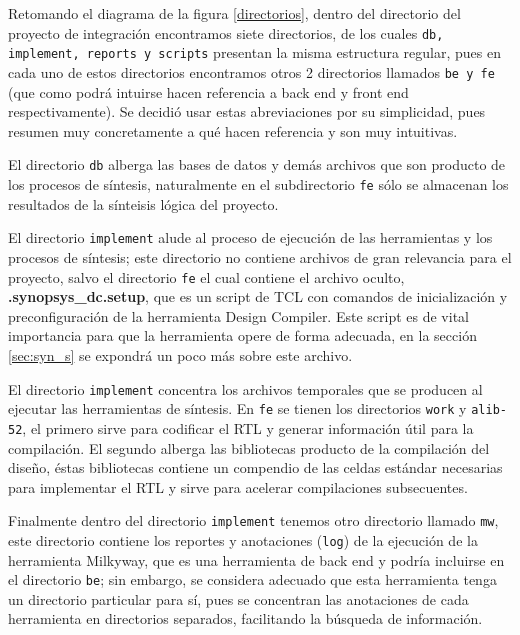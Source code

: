 Retomando el diagrama de la figura \ref{directorios}, dentro del directorio del proyecto de integración encontramos siete directorios, de los cuales \texttt{db, implement, reports y scripts} presentan la misma estructura regular, pues en cada uno de estos directorios encontramos otros 2 directorios llamados \texttt{be y fe} (que como podrá intuirse hacen referencia a back end y front end respectivamente). Se decidió usar estas abreviaciones por su simplicidad, pues resumen muy concretamente a qué hacen referencia y son muy intuitivas.

El directorio \texttt{db} alberga las bases de datos y demás archivos que son producto de los procesos de síntesis, naturalmente en el subdirectorio \texttt{fe} sólo se almacenan los resultados de la sínteisis lógica del proyecto.

El directorio \texttt{implement} alude al proceso de ejecución de las herramientas y los procesos de síntesis; este directorio no contiene archivos de gran relevancia para el proyecto, salvo el directorio \texttt{fe} el cual contiene el archivo oculto, \textbf{.synopsys\_dc.setup}, que es un script de TCL con comandos de inicialización y preconfiguración de la herramienta Design Compiler. Este script es de vital importancia para que la herramienta opere de forma adecuada, en la sección \ref{sec:syn_s} se expondrá un poco más sobre este archivo.

El directorio \texttt{implement} concentra los archivos temporales que se producen al ejecutar las herramientas de síntesis. En \texttt{fe} se tienen los directorios \texttt{work} y \texttt{alib-52}, el primero sirve para codificar el RTL y generar información útil para la compilación. El segundo alberga las bibliotecas producto de la compilación del diseño, éstas bibliotecas contiene un compendio de las celdas estándar necesarias para implementar el RTL y sirve para acelerar compilaciones subsecuentes.

Finalmente dentro del directorio \texttt{implement} tenemos otro directorio llamado \texttt{mw}, este directorio contiene los reportes y anotaciones (\texttt{log}) de la ejecución de la herramienta Milkyway, que es una herramienta de back end y podría incluirse en el directorio \texttt{be}; sin embargo, se considera adecuado que esta herramienta tenga un directorio particular para sí, pues se concentran las anotaciones de cada herramienta en directorios separados, facilitando la búsqueda de información.

